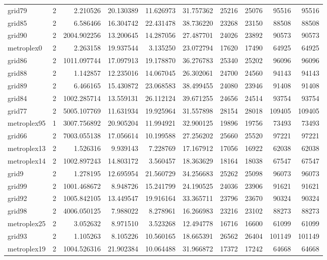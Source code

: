 \begin{longtable}{|l|r|r|r|r|r|r|r|r|r|}
grid79 & 2 & 2.210526 & 20.130389 & 11.626973 & 31.757362 & 25216 & 25076 & 95516 & 95516 \\
grid85 & 2 & 6.586466 & 16.304742 & 22.431478 & 38.736220 & 23268 & 23150 & 88508 & 88508 \\
grid90 & 2 & 2004.902256 & 13.200645 & 14.287056 & 27.487701 & 24026 & 23892 & 90573 & 90573 \\
metroplex0 & 2 & 2.263158 & 19.937544 & 3.135250 & 23.072794 & 17620 & 17490 & 64925 & 64925 \\
grid86 & 2 & 1011.097744 & 17.097913 & 19.178870 & 36.276783 & 25340 & 25202 & 96096 & 96096 \\
grid88 & 2 & 1.142857 & 12.235016 & 14.067045 & 26.302061 & 24700 & 24560 & 94143 & 94143 \\
grid89 & 2 & 6.466165 & 15.430872 & 23.068583 & 38.499455 & 24080 & 23946 & 91408 & 91408 \\
grid84 & 2 & 1002.285714 & 13.559131 & 26.112124 & 39.671255 & 24656 & 24514 & 93754 & 93754 \\
grid77 & 2 & 5005.107769 & 11.631934 & 19.925964 & 31.557898 & 28154 & 28018 & 109405 & 109405 \\
metroplex95 & 1 & 3007.756892 & 20.905204 & 11.994921 & 32.900125 & 19896 & 19756 & 73493 & 73493 \\
grid66 & 2 & 7003.055138 & 17.056614 & 10.199588 & 27.256202 & 25660 & 25520 & 97221 & 97221 \\
metroplex13 & 2 & 1.526316 & 9.939143 & 7.228769 & 17.167912 & 17056 & 16922 & 62038 & 62038 \\
metroplex14 & 2 & 1002.897243 & 14.803172 & 3.560457 & 18.363629 & 18164 & 18038 & 67547 & 67547 \\
grid9 & 2 & 1.278195 & 12.695954 & 21.560729 & 34.256683 & 25262 & 25098 & 96073 & 96073 \\
grid99 & 2 & 1001.468672 & 8.948726 & 15.241799 & 24.190525 & 24036 & 23906 & 91621 & 91621 \\
grid92 & 2 & 1005.842105 & 13.449547 & 19.916164 & 33.365711 & 23796 & 23670 & 90324 & 90324 \\
grid98 & 2 & 4006.050125 & 7.988022 & 8.278961 & 16.266983 & 23216 & 23102 & 88273 & 88273 \\
metroplex25 & 2 & 3.052632 & 8.971510 & 3.523268 & 12.494778 & 16716 & 16600 & 61099 & 61099 \\
grid93 & 2 & 1.105263 & 8.105226 & 10.560165 & 18.665391 & 26562 & 26404 & 101149 & 101149 \\
metroplex19 & 2 & 1004.526316 & 21.902384 & 10.064488 & 31.966872 & 17372 & 17242 & 64668 & 64668 \\

\end{longtable}

